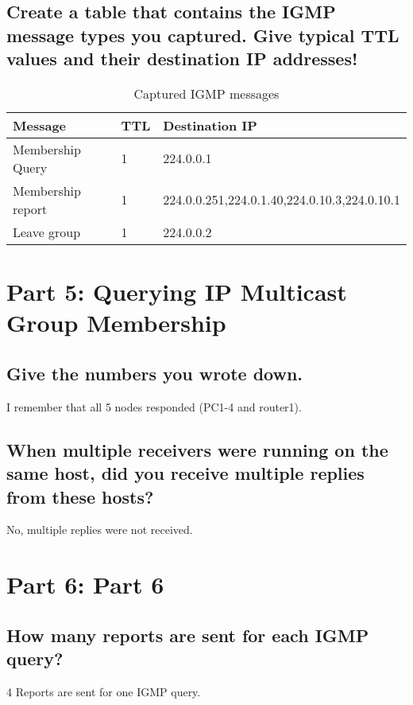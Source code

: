 \documentclass[a4paper, 11pt]{article}
\begin{document}
\subsection {Create a table that contains the IGMP message types you captured. Give typical TTL values and their destination IP addresses! }

\begin{table}
\centering
\begin{tabular}{lll}
	\hline
	\textbf{Message} & \textbf{TTL} & \textbf{Destination IP} \\
	\hline
	Membership Query & 1 & 224.0.0.1 \\
	Membership report & 1 & 224.0.0.251,224.0.1.40,224.0.10.3,224.0.10.1 \\
	Leave group & 1 & 224.0.0.2 \\
	\hline
\end{tabular}
\caption{Captured IGMP messages}
\label{tab:threecols}
\end{table}

\section{Part 5: Querying IP Multicast Group Membership}

\subsection {Give the numbers you wrote down.}

I remember that all 5 nodes responded (PC1-4 and router1). 

\subsection {When multiple receivers were running on the same host, did you receive multiple replies from these hosts? }

No, multiple replies were not received.

\section{Part 6: Part 6}

\subsection{How many reports are sent for each IGMP query?}

4 Reports are sent for one IGMP query.
\end{document}
